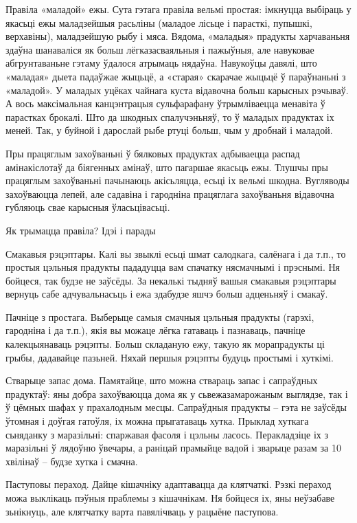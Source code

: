 Правіла «маладой» ежы.
Сута гэтага правіла вельмі простая: імкнуцца выбіраць у якасьці ежы маладзейшыя расьліны (маладое лісьце і парасткі, пупышкі, верхавіны), маладзейшую рыбу і мяса. Вядома, «маладыя» прадукты харчаваньня здаўна шанаваліся як больш лёгказасваяльныя і пажыўныя, але навуковае абгрунтаваньне гэтаму ўдалося атрымаць нядаўна. Навукоўцы давялі, што «маладая» дыета падаўжае жыцьцё, а «старая» скарачае жыцьцё ў параўнаньні з «маладой». У маладых уцёках чайнага куста відавочна больш карысных рэчываў. А вось максімальная канцэнтрацыя сульфарафану ўтрымліваецца менавіта ў парастках брокалі. Што да шкодных спалучэньняў, то ў маладых прадуктах іх меней. Так, у буйной і дарослай рыбе ртуці больш, чым у дробнай і маладой.

Пры працяглым захоўваньні ў бялковых прадуктах адбываецца распад амінакіслотаў да біягенных амінаў, што пагаршае якасьць ежы. Тлушчы пры працяглым захоўваньні пачынаюць акісьляцца, есьці іх вельмі шкодна. Вугляводы захоўваюцца лепей, але садавіна і гародніна працяглага захоўваньня відавочна губляюць свае карысныя ўласьцівасьці.

Як трымацца правіла? Ідэі і парады

Смакавыя рэцэптары.
Калі вы звыклі есьці шмат салодкага, салёнага і да т.п., то простыя цэльныя прадукты пададуцца вам спачатку нясмачнымі і прэснымі. Ня бойцеся, так будзе не заўсёды. За некалькі тыдняў вашыя смакавыя рэцэптары вернуць сабе адчувальнасьць і ежа здабудзе яшчэ больш адценьняў і смакаў.

Пачніце з простага.
Выберыце самыя смачныя цэльныя прадукты (гарэхі, гародніна і да т.п.), якія вы можаце лёгка гатаваць і пазнаваць, пачніце калекцыянаваць рэцэпты. Больш складаную ежу, такую як морапрадукты ці грыбы, дадавайце пазьней. Няхай першыя рэцэпты будуць простымі і хуткімі.

Стварыце запас дома.
Памятайце, што можна ствараць запас і сапраўдных прадуктаў: яны добра захоўваюцца дома як у сьвежазамарожаным выглядзе, так і ў цёмных шафах у прахалодным месцы. Сапраўдныя прадукты – гэта не заўсёды ўтомная і доўгая гатоўля, іх можна прыгатаваць хутка. Прыклад хуткага сьняданку з маразільні: спаржавая фасоля і цэльны ласось. Перакладзіце іх з маразільні ў лядоўню ўвечары, а раніцай прамыйце вадой і зварыце разам за 10 хвілінаў – будзе хутка і смачна.

Паступовы пераход.
Дайце кішачніку адаптавацца да клятчаткі. Рэзкі пераход можа выклікаць пэўныя праблемы з кішачнікам. Ня бойцеся іх, яны неўзабаве зьнікнуць, але клятчатку варта павялічваць у рацыёне паступова.

